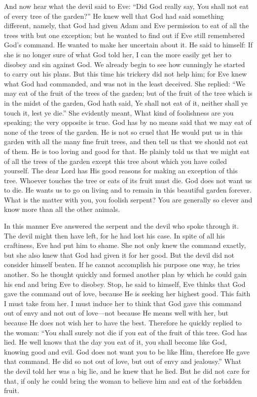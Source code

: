 And now hear what the devil said to Eve: “Did God really say, You shall not eat of every tree of the garden?” He knew well that God had said something different, namely, that God had given Adam and Eve permission to eat of all the trees with but one exception; but he wanted to find out if Eve still remembered God’s command. He wanted to make her uncertain about it. He said to himself: If she is no longer sure of what God told her, I can the more easily get her to disobey and sin against God. We already begin to see how cunningly he started to carry out his plans. But this time his trickery did not help him; for Eve knew what God had commanded, and was not in the least deceived. She replied: “We may eat of the fruit of the trees of the garden; but of the fruit of the tree which is in the midst of the garden, God hath said, Ye shall not eat of it, neither shall ye touch it, lest ye die.” She evidently meant, What kind of foolishness are you speaking; the very opposite is true. God has by no means
said that we may eat of none of the trees of the garden. He is not so cruel that He would put us in this garden with all the many fine fruit trees, and then tell us that we should not eat of them. He is too loving and good for that. He plainly told us that we might eat of all the trees of the garden except this tree about which you have coiled yourself. The dear Lord has His good reasons for making an exception of this tree. Whoever touches the tree or eats of its fruit must die. God does not want us to die. He wants us to go on living and to remain in this beautiful garden forever. What is the matter with you, you foolish serpent? You are generally so clever and know more than all the other animals.

In this manner Eve answered the serpent and the devil who spoke through it. The devil might then have left, for he had lost his case. In spite of all his craftiness, Eve had put him to shame. She not only knew the command exactly, but she also knew that God had given it for her good. But the devil did not consider himself beaten. If he cannot accomplish his purpose one way, he tries another. So he thought quickly and formed another plan by which he could gain his end and bring Eve to disobey. Stop, he said to himself, Eve thinks that God gave the command out of love, because He is seeking her highest good. This faith I must take from her. I must induce her to think that God gave this command out of envy and not out of love—not because He means well with her, but because He does not wish her to have the best. Therefore he quickly replied to the woman: “You shall surely not die if you eat of the fruit of this tree. God has lied. He well knows that the day you eat of it, you shall become like God, knowing good and evil. God does not want you to be like Him, therefore He gave that command. He did so not out of love, but out of envy and jealousy.” What the devil told her was a big lie, and he knew that he lied. But he did not care for that, if only he could bring the woman to believe him and eat of the forbidden fruit.

